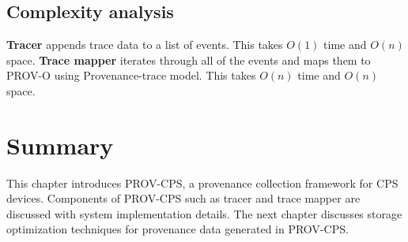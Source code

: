  \subsection{Complexity analysis}

\textbf{Tracer} appends trace data to a list of events. This takes $O(1)$ time and $O(n)$ space. \textbf{Trace mapper} iterates through all of the events and maps them to PROV-O using Provenance-trace model. This takes $O(n)$ time and $O(n)$ space.

\section{Summary}
This chapter introduces PROV-CPS, a provenance collection framework for CPS devices. Components of PROV-CPS such as tracer and trace mapper are discussed with system implementation details. The next chapter discusses storage optimization techniques for provenance data generated in PROV-CPS.







 